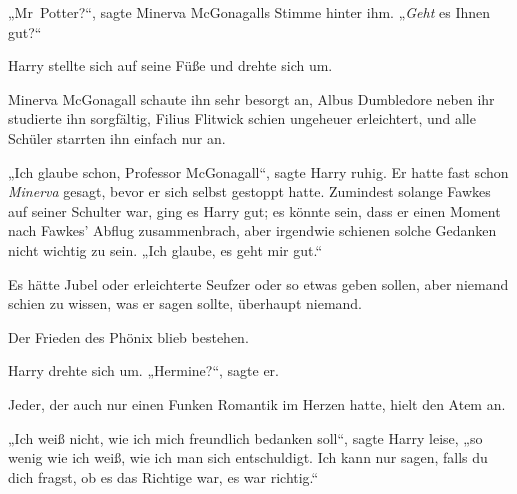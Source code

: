 „Mr~Potter?“, sagte Minerva McGonagalls Stimme hinter ihm. „\emph{Geht} es Ihnen gut?“

Harry stellte sich auf seine Füße und drehte sich um.

Minerva McGonagall schaute ihn sehr besorgt an, Albus Dumbledore neben ihr studierte ihn sorgfältig, Filius Flitwick schien ungeheuer erleichtert, und alle Schüler starrten ihn einfach nur an.

„Ich glaube schon, Professor McGonagall“, sagte Harry ruhig. Er hatte fast schon \emph{Minerva} gesagt, bevor er sich selbst gestoppt hatte. Zumindest solange Fawkes auf seiner Schulter war, ging es Harry gut; es könnte sein, dass er einen Moment nach Fawkes' Abflug zusammenbrach, aber irgendwie schienen solche Gedanken nicht wichtig zu sein. „Ich glaube, es geht mir gut.“

Es hätte Jubel oder erleichterte Seufzer oder so etwas geben sollen, aber niemand schien zu wissen, was er sagen sollte, überhaupt niemand.

Der Frieden des Phönix blieb bestehen.

Harry drehte sich um. „Hermine?“, sagte er.

Jeder, der auch nur einen Funken Romantik im Herzen hatte, hielt den Atem an.

„Ich weiß nicht, wie ich mich freundlich bedanken soll“, sagte Harry leise, „so wenig wie ich weiß, wie ich man sich entschuldigt. Ich kann nur sagen, falls du dich fragst, ob es das Richtige war, es war richtig.“


